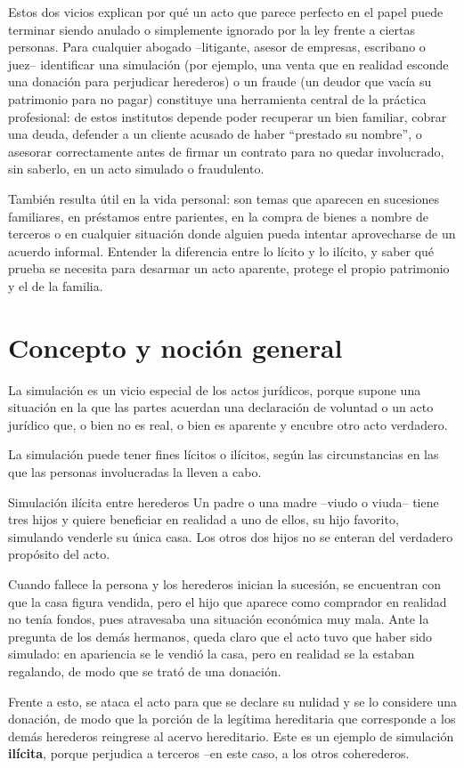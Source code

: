 \documentclass[12pt,oneside]{book}
\begin{document}
\begin{note}
Estos dos vicios explican por qué un acto que parece perfecto en el papel puede terminar siendo anulado o simplemente ignorado por la ley frente a ciertas personas. Para cualquier abogado --litigante, asesor de empresas, escribano o juez-- identificar una simulación (por ejemplo, una venta que en realidad esconde una donación para perjudicar herederos) o un fraude (un deudor que vacía su patrimonio para no pagar) constituye una herramienta central de la práctica profesional: de estos institutos depende poder recuperar un bien familiar, cobrar una deuda, defender a un cliente acusado de haber ``prestado su nombre'', o asesorar correctamente antes de firmar un contrato para no quedar involucrado, sin saberlo, en un acto simulado o fraudulento.

También resulta útil en la vida personal: son temas que aparecen en sucesiones familiares, en préstamos entre parientes, en la compra de bienes a nombre de terceros o en cualquier situación donde alguien pueda intentar aprovecharse de un acuerdo informal. Entender la diferencia entre lo lícito y lo ilícito, y saber qué prueba se necesita para desarmar un acto aparente, protege el propio patrimonio y el de la familia.

\end{note}

\section{Concepto y noción general}

La simulación es un vicio especial de los actos jurídicos, porque supone una situación en la que las partes acuerdan una declaración de voluntad o un acto jurídico que, o bien no es real, o bien es aparente y encubre otro acto verdadero.

La simulación puede tener fines lícitos o ilícitos, según las circunstancias en las que las personas involucradas la lleven a cabo.

\begin{example}{Simulación ilícita entre herederos}
Un padre o una madre --viudo o viuda-- tiene tres hijos y quiere beneficiar en realidad a uno de ellos, su hijo favorito, simulando venderle su única casa. Los otros dos hijos no se enteran del verdadero propósito del acto.

Cuando fallece la persona y los herederos inician la sucesión, se encuentran con que la casa figura vendida, pero el hijo que aparece como comprador en realidad no tenía fondos, pues atravesaba una situación económica muy mala. Ante la pregunta de los demás hermanos, queda claro que el acto tuvo que haber sido simulado: en apariencia se le vendió la casa, pero en realidad se la estaban regalando, de modo que se trató de una donación.

Frente a esto, se ataca el acto para que se declare su nulidad y se lo considere una donación, de modo que la porción de la legítima hereditaria que corresponde a los demás herederos reingrese al acervo hereditario. Este es un ejemplo de simulación \textbf{ilícita}, porque perjudica a terceros --en este caso, a los otros coherederos.
\end{example}
\end{document}
